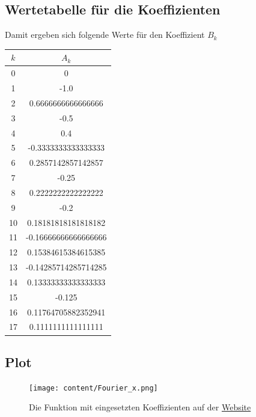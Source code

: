 \subsection{Wertetabelle für die Koeffizienten}
Damit ergeben sich folgende Werte für den Koeffizient $B_k$
\begin{table}
  \centering
  \label{tab:koeffizienten}
  \begin{tabular}{c c}
    \toprule
    $k$ & $A_k$\\
    \midrule
    0 &0 \\
    1 &-1.0 \\
    2 &0.6666666666666666\\
    3 &-0.5\\
    4 &0.4\\
    5 &-0.3333333333333333\\
    6 &0.2857142857142857\\
    7 &-0.25\\
    8 &0.2222222222222222\\
    9 &-0.2\\
    10 &0.18181818181818182\\
    11 &-0.16666666666666666\\
    12 &0.15384615384615385\\
    13 &-0.14285714285714285\\
    14 &0.13333333333333333\\
    15 &-0.125\\
    16 &0.11764705882352941\\
    17 & 0.1111111111111111 \\
    \bottomrule
  \end{tabular}
\end{table}
\newpage
\subsection{Plot}
\begin{figure}
  \centering
  \texttt{[image: content/Fourier\_x.png]}
  \caption{Die Funktion mit eingesetzten Koeffizienten auf der \href{https://www.j-berkemeier.de/Fouriersynthese.html}{Website}}
  \label{fig:f(x)=x}
\end{figure}

